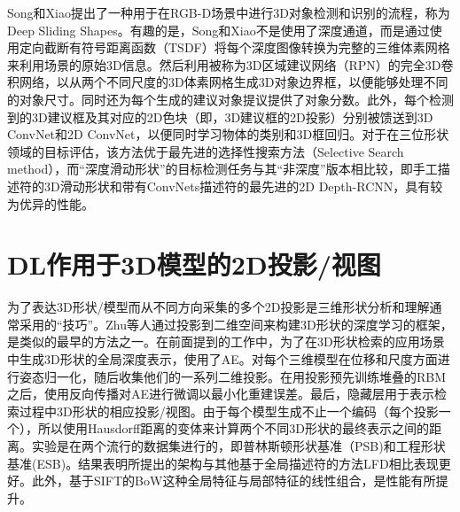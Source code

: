 Song和Xiao\cite{Song2015Deep}提出了一种用于在RGB-D场景中进行3D对象检测和识别的流程，称为Deep Sliding Shapes。有趣的是，Song和Xiao不是使用了深度通道，而是通过使用定向截断有符号距离函数（TSDF）将每个深度图像转换为完整的三维体素网格来利用场景的原始3D信息。然后利用被称为3D区域建议网络（RPN）的完全3D卷积网络，以从两个不同尺度的3D体素网格生成3D对象边界框，以便能够处理不同的对象尺寸。同时还为每个生成的建议对象提议提供了对象分数。此外，每个检测到的3D建议框及其对应的2D色块（即，3D建议框的2D投影）分别被馈送到3D ConvNet和2D ConvNet，以便同时学习物体的类别和3D框回归。对于在三位形状领域的目标评估，该方法优于最先进的选择性搜索方法（Selective Search method）\cite{Uijlings2013Selective}，而“深度滑动形状”\cite{Song2015Deep}的目标检测任务与其“非深度”版本相比较，即手工描述符的3D滑动形状\cite{Song2014Sliding}和带有ConvNets描述符的最先进的2D Depth-RCNN\cite{Gupta2014Learning}，具有较为优异的性能。


\section{DL作用于3D模型的2D投影/视图}
为了表达3D形状/模型而从不同方向采集的多个2D投影是三维形状分析和理解通常采用的“技巧”。Zhu等人\cite{Zhu2014Deep}通过投影到二维空间来构建3D形状的深度学习的框架，是类似的最早的方法之一。在前面提到的工作中，为了在3D形状检索的应用场景中生成3D形状的全局深度表示，使用了AE。对每个三维模型在位移和尺度方面进行姿态归一化，随后收集他们的一系列二维投影。在用投影预先训练堆叠的RBM之后，使用反向传播对AE进行微调以最小化重建误差。最后，隐藏层用于表示检索过程中3D形状的相应投影/视图。由于每个模型生成不止一个编码（每个投影一个），所以使用Hausdorff距离的变体来计算两个不同3D形状的最终表示之间的距离。实验是在两个流行的数据集进行的，即普林斯顿形状基准（PSB)\cite{Shilane2004The}和工程形状基准(ESB)\cite{Jayanti2006Developing}。结果表明所提出的架构与其他基于全局描述符的方法LFD\cite{Chen2003On}相比表现更好。此外，基于SIFT的BoW这种全局特征与局部特征的线性组合，是性能有所提升。

